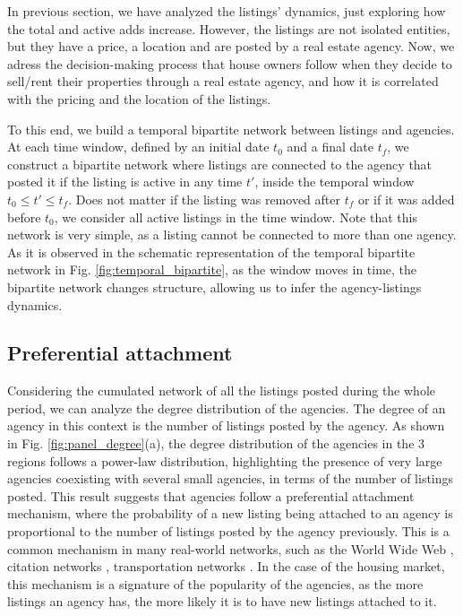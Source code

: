 In previous section, we have analyzed the listings' dynamics, just exploring how the total and active adds increase. However, the listings are not isolated entities, but they have a price, a location and are posted by a real estate agency. Now, we adress the decision-making process that house owners follow when they decide to sell/rent their properties through a real estate agency, and how it is correlated with the pricing and the location of the listings.

To this end, we build a temporal bipartite network between listings and agencies. At each time window, defined by an initial date $t_0$ and a final date $t_f$, we construct a bipartite network where listings are connected to the agency that posted it if the listing is active in any time $t'$, inside the temporal window $t_0 \leq t' \leq t_f$. Does not matter if the listing was removed after $t_f$ or if it was added before $t_0$, we consider all active listings in the time window. Note that this network is very simple, as a listing cannot be connected to more than one agency. As it is observed in the schematic representation of the temporal bipartite network in Fig. \ref{fig:temporal_bipartite}, as the window moves in time, the bipartite network changes structure, allowing us to infer the agency-listings dynamics.

\subsection{Preferential attachment}

Considering the cumulated network of all the listings posted during the whole period, we can analyze the degree distribution of the agencies. The degree of an agency in this context is the number of listings posted by the agency. As shown in Fig. \ref{fig:panel_degree}(a), the degree distribution of the agencies in the 3 regions follows a power-law distribution, highlighting the presence of very large agencies coexisting with several small agencies, in terms of the number of listings posted. This result suggests that agencies follow a preferential attachment mechanism, where the probability of a new listing being attached to an agency is proportional to the number of listings posted by the agency previously. This is a common mechanism in many real-world networks, such as the World Wide Web \cite{barabasi1999emergence}, citation networks \cite{redner1998popular}, transportation networks \cite{barrat2004architecture}. In the case of the housing market, this mechanism is a signature of the popularity of the agencies, as the more listings an agency has, the more likely it is to have new listings attached to it.

